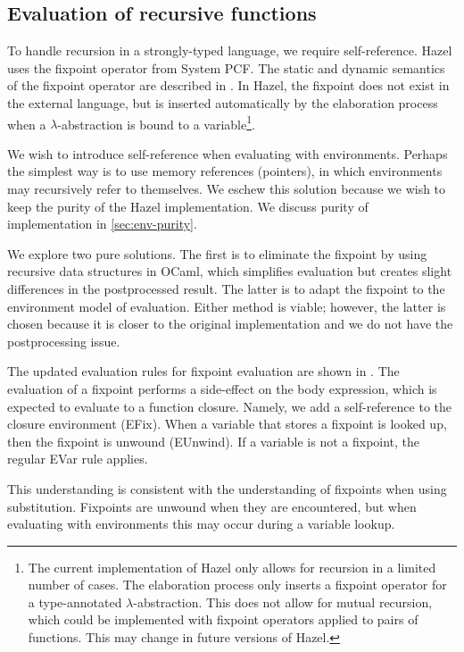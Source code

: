 \subsection{Evaluation of recursive functions}
\label{sec:rec_impl}

To handle recursion in a strongly-typed language, we require self-reference. Hazel uses the fixpoint operator from System PCF. The static and dynamic semantics of the fixpoint operator are described in . In Hazel, the fixpoint does not exist in the external language, but is inserted automatically by the elaboration process when a $\lambda$-abstraction is bound to a variable\footnote{The current implementation of Hazel only allows for recursion in a limited number of cases. The elaboration process only inserts a fixpoint operator for a type-annotated $\lambda$-abstraction. This does not allow for mutual recursion, which could be implemented with fixpoint operators applied to pairs of functions. This may change in future versions of Hazel.}.

We wish to introduce self-reference when evaluating with environments. Perhaps the simplest way is to use memory references (pointers), in which environments may recursively refer to themselves. We eschew this solution because we wish to keep the purity of the Hazel implementation. We discuss purity of implementation in \cref{sec:env-purity}.

We explore two pure solutions. The first is to eliminate the fixpoint by using recursive data structures in OCaml, which simplifies evaluation but creates slight differences in the postprocessed result. The latter is to adapt the fixpoint to the environment model of evaluation. Either method is viable; however, the latter is chosen because it is closer to the original implementation and we do not have the postprocessing issue.

The updated evaluation rules for fixpoint evaluation are shown in . The evaluation of a fixpoint performs a side-effect on the body expression, which is expected to evaluate to a function closure. Namely, we add a self-reference to the closure environment (EFix). When a variable that stores a fixpoint is looked up, then the fixpoint is unwound (EUnwind). If a variable is not a fixpoint, the regular EVar rule applies.

This understanding is consistent with the understanding of fixpoints when using substitution. Fixpoints are unwound when they are encountered, but when evaluating with environments this may occur during a variable lookup.

